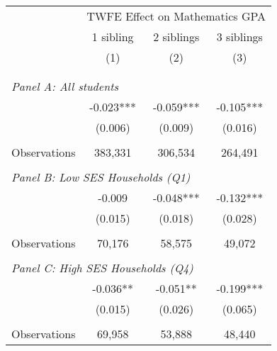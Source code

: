 \makeatletter
{}
{
\makeatother
\begin{tabular}{lccc}
\toprule
\cmidrule(lr){2-4}
& \multicolumn{3}{c}{TWFE Effect on Mathematics GPA} \\
\cmidrule(lr){2-4}
& 1 sibling & 2 siblings & 3 siblings  \\
\cmidrule(lr){2-2} \cmidrule(lr){3-3} \cmidrule(lr){4-4}
& (1) & (2) & (3)\\
\bottomrule
&  &  &  \\
&  &  &   \\
\multicolumn{4}{l}{\textit{Panel A: All students}} \\
\hspace{3mm}        &      -0.023***&      -0.059***&      -0.105***\\
                    &     (0.006)   &     (0.009)   &     (0.016)   \\
                    &               &               &               \\
\hspace{3mm}Observations&     383,331   &     306,534   &     264,491   \\
 
&  &  &   \\
\multicolumn{4}{l}{\textit{Panel B: Low SES Households (Q1)}} \\
\hspace{3mm}        &      -0.009   &      -0.048***&      -0.132***\\
                    &     (0.015)   &     (0.018)   &     (0.028)   \\
                    &               &               &               \\
\hspace{3mm}Observations&      70,176   &      58,575   &      49,072   \\
 
&  &  &   \\
\multicolumn{4}{l}{\textit{Panel C: High SES Households (Q4)}} \\
\hspace{3mm}        &      -0.036** &      -0.051** &      -0.199***\\
                    &     (0.015)   &     (0.026)   &     (0.065)   \\
                    &               &               &               \\
\hspace{3mm}Observations&      69,958   &      53,888   &      48,440   \\
 

\end{tabular}}
